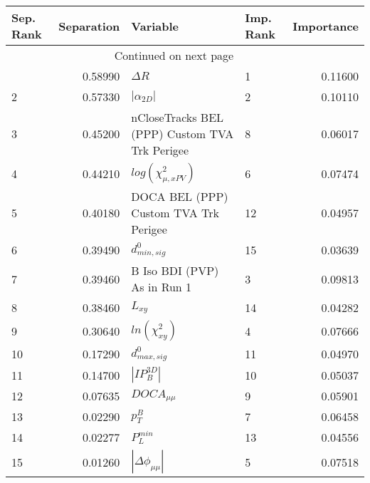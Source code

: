 \usepackage{lscape}

\begin{landscape}
\begin{longtable}{lrllr}
\toprule
Sep. Rank &  Separation &                                       Variable & Imp. Rank &  Importance \\
\midrule
\endhead
\midrule
\multicolumn{3}{r}{{Continued on next page}} \\
\midrule
\endfoot

\bottomrule
\endlastfoot
        1 &     0.58990 &                                     $\Delta R$ &         1 &     0.11600 \\
        2 &     0.57330 &                                $|\alpha_{2D}|$ &         2 &     0.10110 \\
        3 &     0.45200 &  nCloseTracks BEL (PPP) Custom TVA Trk Perigee &         8 &     0.06017 \\
        4 &     0.44210 &                      $log(\chi^{2}_{\mu,xPV})$ &         6 &     0.07474 \\
        5 &     0.40180 &          DOCA BEL (PPP) Custom TVA Trk Perigee &        12 &     0.04957 \\
        6 &     0.39490 &                               $d^0_{min, sig}$ &        15 &     0.03639 \\
        7 &     0.39460 &                    B Iso BDI (PVP) As in Run 1 &         3 &     0.09813 \\
        8 &     0.38460 &                                       $L_{xy}$ &        14 &     0.04282 \\
        9 &     0.30640 &                            $ln(\chi^{2}_{xy})$ &         4 &     0.07666 \\
       10 &     0.17290 &                               $d^0_{max, sig}$ &        11 &     0.04970 \\
       11 &     0.14700 &                                $|IP_{B}^{3D}|$ &        10 &     0.05037 \\
       12 &     0.07635 &                                $DOCA_{\mu\mu}$ &         9 &     0.05901 \\
       13 &     0.02290 &                                      $p^B_{T}$ &         7 &     0.06458 \\
       14 &     0.02277 &                                  $P^{min}_{L}$ &        13 &     0.04556 \\
       15 &     0.01260 &                       $|\Delta \phi_{\mu\mu}|$ &         5 &     0.07518 \\
\end{longtable}

\end{landscape}
